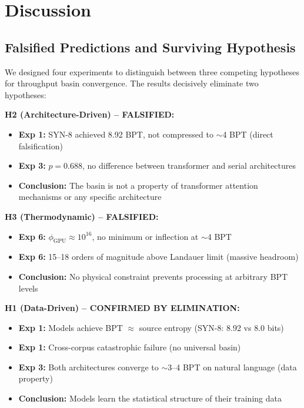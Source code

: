 \documentclass[11pt,a4paper]{article}
\begin{document}
\section{Discussion}

\subsection{Falsified Predictions and Surviving Hypothesis}

We designed four experiments to distinguish between three competing hypotheses for throughput basin convergence. The results decisively eliminate two hypotheses:

\textbf{H2 (Architecture-Driven) -- FALSIFIED:}
\begin{itemize}
\item \textbf{Exp 1:} SYN-8 achieved 8.92 BPT, not compressed to $\sim$4 BPT (direct falsification)
\item \textbf{Exp 3:} $p = 0.688$, no difference between transformer and serial architectures
\item \textbf{Conclusion:} The basin is not a property of transformer attention mechanisms or any specific architecture
\end{itemize}

\textbf{H3 (Thermodynamic) -- FALSIFIED:}
\begin{itemize}
\item \textbf{Exp 6:} $\phi_{\text{GPU}} \approx 10^{16}$, no minimum or inflection at $\sim$4 BPT
\item \textbf{Exp 6:} 15--18 orders of magnitude above Landauer limit (massive headroom)
\item \textbf{Conclusion:} No physical constraint prevents processing at arbitrary BPT levels
\end{itemize}

\textbf{H1 (Data-Driven) -- CONFIRMED BY ELIMINATION:}
\begin{itemize}
\item \textbf{Exp 1:} Models achieve BPT $\approx$ source entropy (SYN-8: 8.92 vs 8.0 bits)
\item \textbf{Exp 1:} Cross-corpus catastrophic failure (no universal basin)
\item \textbf{Exp 3:} Both architectures converge to $\sim$3--4 BPT on natural language (data property)
\item \textbf{Conclusion:} Models learn the statistical structure of their training data
\end{itemize}
\end{document}
